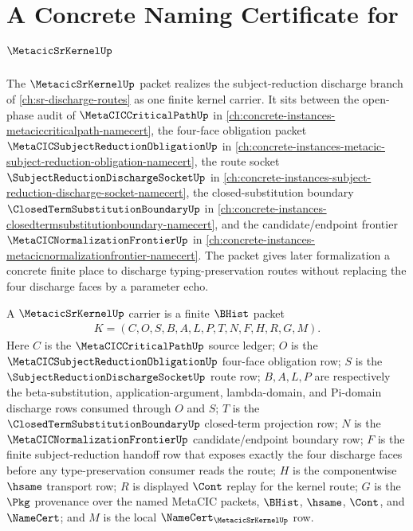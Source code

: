 \chapter{A Concrete Naming Certificate for $\MetacicSrKernelUp$}
\label{ch:concrete-instances-metacic-sr-kernel-namecert}

The $\MetacicSrKernelUp$ packet realizes the subject-reduction discharge branch of \autoref{ch:sr-discharge-routes} as one finite kernel carrier. It sits between the open-phase audit of $\MetaCICCriticalPathUp$ in \autoref{ch:concrete-instances-metaciccriticalpath-namecert}, the four-face obligation packet $\MetaCICSubjectReductionObligationUp$ in \autoref{ch:concrete-instances-metacic-subject-reduction-obligation-namecert}, the route socket $\SubjectReductionDischargeSocketUp$ in \autoref{ch:concrete-instances-subject-reduction-discharge-socket-namecert}, the closed-substitution boundary $\ClosedTermSubstitutionBoundaryUp$ in \autoref{ch:concrete-instances-closedtermsubstitutionboundary-namecert}, and the candidate/endpoint frontier $\MetaCICNormalizationFrontierUp$ in \autoref{ch:concrete-instances-metacicnormalizationfrontier-namecert}. The packet gives later formalization a concrete finite place to discharge typing-preservation routes without replacing the four discharge faces by a parameter echo.

\begin{theorem}\label{thm:metacic-sr-kernel-carrier}
A $\MetacicSrKernelUp$ carrier is a finite $\BHist$ packet
$$
\begin{gathered}
K=(C,O,S,B,A,L,P,T,N,F,H,R,G,M).
\end{gathered}
$$
Here $C$ is the $\MetaCICCriticalPathUp$ source ledger; $O$ is the $\MetaCICSubjectReductionObligationUp$ four-face obligation row; $S$ is the $\SubjectReductionDischargeSocketUp$ route row; $B,A,L,P$ are respectively the beta-substitution, application-argument, lambda-domain, and Pi-domain discharge rows consumed through $O$ and $S$; $T$ is the $\ClosedTermSubstitutionBoundaryUp$ closed-term projection row; $N$ is the $\MetaCICNormalizationFrontierUp$ candidate/endpoint boundary row; $F$ is the finite subject-reduction handoff row that exposes exactly the four discharge faces before any type-preservation consumer reads the route; $H$ is the componentwise $\hsame$ transport row; $R$ is displayed $\Cont$ replay for the kernel route; $G$ is the $\Pkg$ provenance over the named MetaCIC packets, $\BHist$, $\hsame$, $\Cont$, and $\NameCert$; and $M$ is the local $\NameCert_{\MetacicSrKernelUp}$ row.
\end{theorem}

